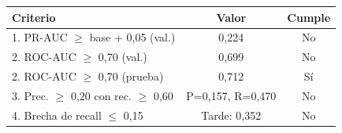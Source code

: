 \begin{tabular}{@{}lcc@{}}
\toprule
Criterio & Valor & Cumple \\
\midrule
1. PR-AUC $\geq$ base + 0,05 (val.) & 0,224 & No \\
2. ROC-AUC $\geq$ 0,70 (val.) & 0,699 & No \\
2. ROC-AUC $\geq$ 0,70 (prueba) & 0,712 & Sí \\
3. Prec. $\geq$ 0,20 con rec. $\geq$ 0,60 & P=0,157, R=0,470 & No \\
4. Brecha de recall $\leq$ 0,15 & Tarde: 0,352 & No \\
\bottomrule
\end{tabular}
